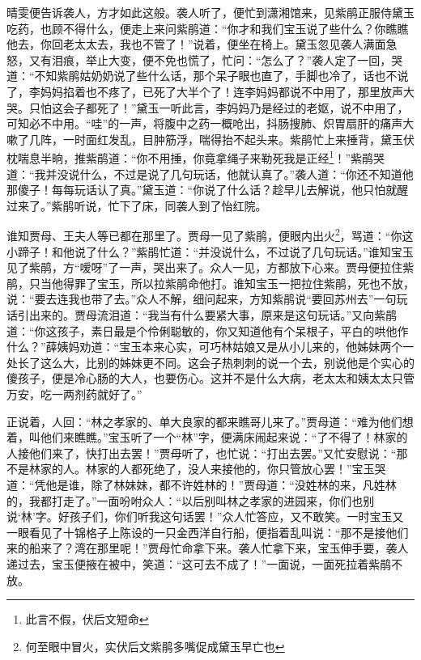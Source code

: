 \documentclass[12pt,oneside]{book}
\begin{document}
晴雯便告诉袭人，方才如此这般。袭人听了，便忙到潇湘馆来，见紫鹃正服侍黛玉吃药，也顾不得什么，便走上来问紫鹃道：“你才和我们宝玉说了些什么？你瞧瞧他去，你回老太太去，我也不管了！”说着，便坐在椅上。黛玉忽见袭人满面急怒，又有泪痕，举止大变，便不免也慌了，忙问：“怎么了？”袭人定了一回，哭道：“不知紫鹃姑奶奶说了些什么话，那个呆子眼也直了，手脚也冷了，话也不说了，李妈妈掐着也不疼了，已死了大半个了！连李妈妈都说不中用了，那里放声大哭。只怕这会子都死了！”黛玉一听此言，李妈妈乃是经过的老妪，说不中用了，可知必不中用。“哇”的一声，将腹中之药一概呛出，抖肠搜肺、炽胃扇肝的痛声大嗽了几阵，一时面红发乱，目肿筋浮，喘得抬不起头来。紫鹃忙上来捶背，黛玉伏枕喘息半晌，推紫鹃道：“你不用捶，你竟拿绳子来勒死我是正经\footnote{此言不假，伏后文短命}！”紫鹃哭道：“我并没说什么，不过是说了几句玩话，他就认真了。”袭人道：“你还不知道他那傻子！每每玩话认了真。”黛玉道：“你说了什么话？趁早儿去解说，他只怕就醒过来了。”紫鹃听说，忙下了床，同袭人到了怡红院。

谁知贾母、王夫人等已都在那里了。贾母一见了紫鹃，便眼内出火\footnote{何至眼中冒火，实伏后文紫鹃多嘴促成黛玉早亡也}，骂道：“你这小蹄子！和他说了什么？”紫鹃忙道：“并没说什么，不过说了几句玩话。”谁知宝玉见了紫鹃，方“嗳呀”了一声，哭出来了。众人一见，方都放下心来。贾母便拉住紫鹃，只当他得罪了宝玉，所以拉紫鹃命他打。谁知宝玉一把拉住紫鹃，死也不放，说：“要去连我也带了去。”众人不解，细问起来，方知紫鹃说“要回苏州去”一句玩话引出来的。贾母流泪道：“我当有什么要紧大事，原来是这句玩话。”又向紫鹃道：“你这孩子，素日最是个伶俐聪敏的，你又知道他有个呆根子，平白的哄他作什么？”薛姨妈劝道：“宝玉本来心实，可巧林姑娘又是从小儿来的，他姊妹两个一处长了这么大，比别的姊妹更不同。这会子热刺刺的说一个去，别说他是个实心的傻孩子，便是冷心肠的大人，也要伤心。这并不是什么大病，老太太和姨太太只管万安，吃一两剂药就好了。”

正说着，人回：“林之孝家的、单大良家的都来瞧哥儿来了。”贾母道：“难为他们想着，叫他们来瞧瞧。”宝玉听了一个“林”字，便满床闹起来说：“了不得了！林家的人接他们来了，快打出去罢！”贾母听了，也忙说：“打出去罢。”又忙安慰说：“那不是林家的人。林家的人都死绝了，没人来接他的，你只管放心罢！”宝玉哭道：“凭他是谁，除了林妹妹，都不许姓林的！”贾母道：“没姓林的来，凡姓林的，我都打走了。”一面吩咐众人：“以后别叫林之孝家的进园来，你们也别说‘林’字。好孩子们，你们听我这句话罢！”众人忙答应，又不敢笑。一时宝玉又一眼看见了十锦格子上陈设的一只金西洋自行船，便指着乱叫说：“那不是接他们来的船来了？湾在那里呢！”贾母忙命拿下来。袭人忙拿下来，宝玉伸手要，袭人递过去，宝玉便掖在被中，笑道：“这可去不成了！”一面说，一面死拉着紫鹃不放。
\end{document}
